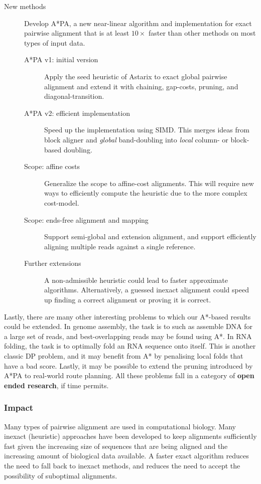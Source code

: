 \documentclass[11pt,english,a4paper]{article}
\begin{document}
\begin{description}
\item[{New methods}] Develop A*PA, a new near-linear algorithm and implementation for exact
pairwise alignment that is at least \(10\times\) faster than other methods on most types
of input data.
\begin{description}
\item[{A*PA v1: initial version}] Apply the seed heuristic of Astarix
\autocite{astarix-2} to exact global pairwise alignment and extend it with
chaining, gap-costs, pruning, and diagonal-transition.
\item[{A*PA v2: efficient implementation}] Speed up the implementation using
SIMD. This merges ideas from block aligner \autocite{block-aligner} and
\emph{global} band-doubling \autocite{ukkonen85} into \emph{local} column- or block-based doubling.
\item[{Scope: affine costs}] Generalize the scope to affine-cost alignments.
This will require new ways to efficiently compute the heuristic due to the
more complex cost-model.
\item[{Scope: ends-free alignment and mapping}] Support semi-global and extension
alignment, and support efficiently aligning multiple reads against a single
reference.
\item[{Further extensions}] A non-admissible heuristic could lead to faster
approximate algorithms. Alternatively, a guessed inexact alignment could
speed up finding a correct alignment or proving it is correct.
\end{description}
\end{description}

Lastly, there are many other interesting problems to which our A*-based results
could be extended. In genome assembly, the task is to  such as assemble DNA for
a large set of reads, and best-overlapping reads may be found using A*.
In RNA folding, the task is to optimally fold an RNA sequence onto itself. This
is another classic DP problem, and it may benefit from A* by penalising local
folds that have a bad score.  Lastly, it may be possible to extend the pruning
introduced by A*PA to real-world route planning.  All these problems fall in a
category of \textbf{open ended research}, if time permits.

\subsubsection{Impact}
\label{sec:org6eb65d4}
Many types of pairwise alignment are used in computational biology. Many
inexact (heuristic) approaches have been developed to keep alignments
sufficiently fast given the increasing size of sequences that are being aligned and
the increasing amount of biological data available. A faster exact algorithm
reduces the need to fall back to inexact methods, and reduces the need to accept
the possibility of suboptimal alignments.
\end{document}
